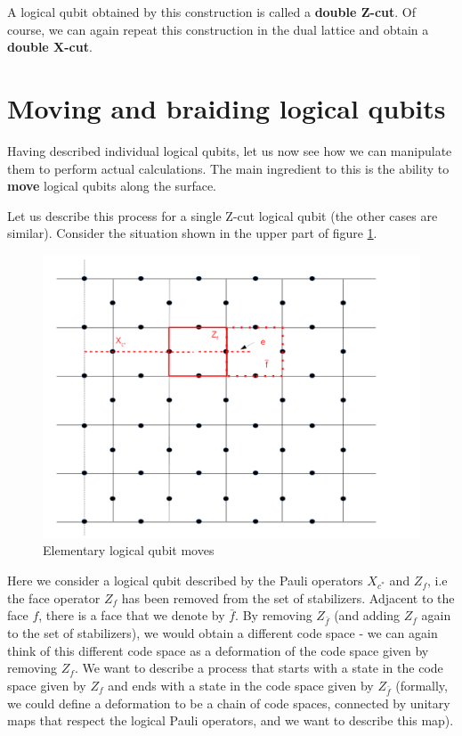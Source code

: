 \documentclass[a4paper, draft]{article}
\theoremstyle{own}
\theoremstyle{remark}
\begin{document}
A logical qubit obtained by this construction is called a {\bf double Z-cut}. Of course, we can again repeat this construction in the dual lattice and obtain a {\bf double X-cut}.

\section{Moving and braiding logical qubits}



Having described individual logical qubits, let us now see how we can manipulate them to perform actual calculations. The main ingredient to this is the ability to {\bf move} logical qubits along the surface.

Let us describe this process for a single Z-cut logical qubit (the other cases are similar). Consider the situation shown in the upper part of figure \ref{fig:ElementaryMove}.

\begin{figure}[ht]
\centering
\includegraphics[width=0.7\linewidth]{images/ElementaryMove}
\caption[Elementary logical qubit moves]{Elementary logical qubit moves}
\label{fig:ElementaryMove}
\end{figure}

Here we consider a logical qubit described by the Pauli operators $X_{c^*}$ and $Z_f$, i.e the face operator $Z_f$ has been removed from the set of stabilizers. Adjacent to the face $f$, there is a face that we denote by $\bar{f}$. By removing $Z_{\bar{f}}$ (and adding $Z_f$ again to the set of stabilizers), we would obtain a different code space - we can again think of this different code space as a deformation of the code space given by removing $Z_f$. We want to describe a process that starts with a state in the code space given by $Z_f$ and ends with a state in the code space given by $Z_{\bar{f}}$ (formally, we could define a deformation to be a chain of code spaces, connected by unitary maps that respect the logical Pauli operators, and we want to describe this map).
\end{document}
